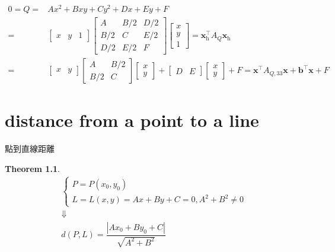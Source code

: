 \documentclass[
]{book}
\newtheorem{theorem}{Theorem}[chapter]
\theoremstyle{definition}
\theoremstyle{definition}
\theoremstyle{definition}
\theoremstyle{definition}
\theoremstyle{remark}
\begin{document}
\[
\begin{aligned}
0=Q= & Ax^{2}+Bxy+Cy^{2}+Dx+Ey+F\\
= & \begin{bmatrix}x & y & 1\end{bmatrix}\begin{bmatrix}A & B/2 & D/2\\
B/2 & C & E/2\\
D/2 & E/2 & F
\end{bmatrix}\begin{bmatrix}x\\
y\\
1
\end{bmatrix}=\boldsymbol{x}_{{\scriptscriptstyle \text{h}}}^{\intercal}A_{{\scriptscriptstyle Q}}\boldsymbol{x}_{{\scriptscriptstyle \text{h}}}\\
= & \begin{bmatrix}x & y\end{bmatrix}\begin{bmatrix}A & B/2\\
B/2 & C
\end{bmatrix}\begin{bmatrix}x\\
y
\end{bmatrix}+\begin{bmatrix}D & E\end{bmatrix}\begin{bmatrix}x\\
y
\end{bmatrix}+F=\boldsymbol{x}^{\intercal}A_{{\scriptscriptstyle Q,33}}\boldsymbol{x}+\boldsymbol{b}^{\intercal}\boldsymbol{x}+F
\end{aligned}
\]

\hypertarget{distance-from-a-point-to-a-line}{%
\chapter{distance from a point to a line}\label{distance-from-a-point-to-a-line}}

\begin{CJK}{UTF8}{bsmi}
點到直線距離
\end{CJK}

\begin{theorem}
\protect\hypertarget{thm:unnamed-chunk-1}{}\label{thm:unnamed-chunk-1}\[
\begin{array}{c}
\begin{cases}
P=P\left(x_{0},y_{0}\right)\\
L=L\left(x,y\right)=Ax+By+C=0,A^{2}+B^{2}\ne0
\end{cases}\\
\Downarrow\\
d\left(P,L\right)=\dfrac{\left|Ax_{0}+By_{0}+C\right|}{\sqrt{A^{2}+B^{2}}}
\end{array}
\]
\end{theorem}
\end{document}
